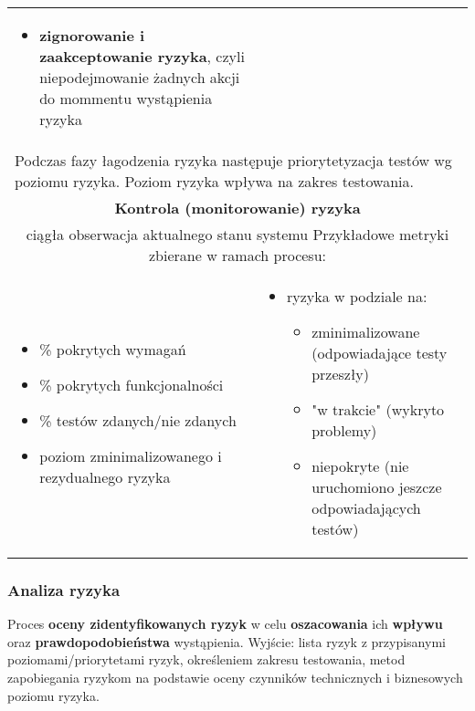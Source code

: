 \documentclass[../main.tex]{subfiles}
\begin{document}
\begin{table}[H]
\begin{center}
\begin{tabular}{| p{8cm}  p{8cm} |}
\begin{itemize}
                    \item \textbf{zignorowanie i zaakceptowanie ryzyka}, czyli niepodejmowanie żadnych akcji do mommentu wystąpienia ryzyka
                \end{itemize} \\
                \multicolumn{2}{|p{16cm}|}{Podczas fazy łagodzenia ryzyka następuje priorytetyzacja testów wg poziomu ryzyka. Poziom ryzyka wpływa na zakres testowania.} \\
                \hline
                \hline
                \multicolumn{2}{|c|}{\textbf{Kontrola (monitorowanie) ryzyka}} \\
                \multicolumn{2}{|c|}{ciągła obserwacja aktualnego stanu systemu Przykładowe metryki zbierane w ramach procesu:} \\
                \hline
                \begin{itemize}
                    \item \% pokrytych wymagań
                    \item \% pokrytych funkcjonalności
                    \item \% testów zdanych/nie zdanych
                    \item poziom zminimalizowanego i rezydualnego ryzyka
                \end{itemize}
                &
                \begin{itemize}
                    \item ryzyka w podziale na:
                    \begin{itemize}
                        \item zminimalizowane (odpowiadające testy przeszły)
                        \item "w trakcie" (wykryto problemy)
                        \item niepokryte (nie uruchomiono jeszcze odpowiadających testów)
                    \end{itemize}
                \end{itemize} \\
                \hline
            \end{tabular}
        \end{center}
    \end{table}

    \subsubsection{Analiza ryzyka}
    Proces \textbf{oceny zidentyfikowanych ryzyk} w celu \textbf{oszacowania} ich \textbf{wpływu}
    oraz \textbf{prawdopodobieństwa} wystąpienia. Wyjście: lista ryzyk z przypisanymi poziomami/priorytetami ryzyk, określeniem zakresu testowania, metod zapobiegania ryzykom na podstawie oceny czynników technicznych i biznesowych poziomu ryzyka.
\end{document}

